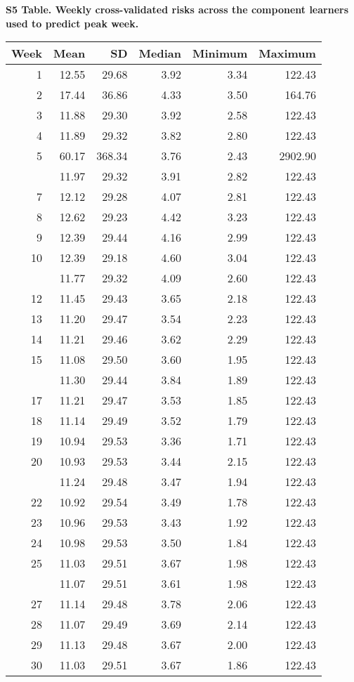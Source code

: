\documentclass[10pt,letterpaper]{article}
\begin{document}
\newpage

\noindent \textbf{S5 Table. Weekly cross-validated risks across the
component learners used to predict peak week.}

\begin{tabular}{rrrrrr}
\toprule
Week & Mean & SD & Median & Minimum & Maximum\\
\midrule
1 & 12.55 & 29.68 & 3.92 & 3.34 & 122.43\\
2 & 17.44 & 36.86 & 4.33 & 3.50 & 164.76\\
3 & 11.88 & 29.30 & 3.92 & 2.58 & 122.43\\
4 & 11.89 & 29.32 & 3.82 & 2.80 & 122.43\\
5 & 60.17 & 368.34 & 3.76 & 2.43 & 2902.90\\
\addlinespace
6 & 11.97 & 29.32 & 3.91 & 2.82 & 122.43\\
7 & 12.12 & 29.28 & 4.07 & 2.81 & 122.43\\
8 & 12.62 & 29.23 & 4.42 & 3.23 & 122.43\\
9 & 12.39 & 29.44 & 4.16 & 2.99 & 122.43\\
10 & 12.39 & 29.18 & 4.60 & 3.04 & 122.43\\
\addlinespace
11 & 11.77 & 29.32 & 4.09 & 2.60 & 122.43\\
12 & 11.45 & 29.43 & 3.65 & 2.18 & 122.43\\
13 & 11.20 & 29.47 & 3.54 & 2.23 & 122.43\\
14 & 11.21 & 29.46 & 3.62 & 2.29 & 122.43\\
15 & 11.08 & 29.50 & 3.60 & 1.95 & 122.43\\
\addlinespace
16 & 11.30 & 29.44 & 3.84 & 1.89 & 122.43\\
17 & 11.21 & 29.47 & 3.53 & 1.85 & 122.43\\
18 & 11.14 & 29.49 & 3.52 & 1.79 & 122.43\\
19 & 10.94 & 29.53 & 3.36 & 1.71 & 122.43\\
20 & 10.93 & 29.53 & 3.44 & 2.15 & 122.43\\
\addlinespace
21 & 11.24 & 29.48 & 3.47 & 1.94 & 122.43\\
22 & 10.92 & 29.54 & 3.49 & 1.78 & 122.43\\
23 & 10.96 & 29.53 & 3.43 & 1.92 & 122.43\\
24 & 10.98 & 29.53 & 3.50 & 1.84 & 122.43\\
25 & 11.03 & 29.51 & 3.67 & 1.98 & 122.43\\
\addlinespace
26 & 11.07 & 29.51 & 3.61 & 1.98 & 122.43\\
27 & 11.14 & 29.48 & 3.78 & 2.06 & 122.43\\
28 & 11.07 & 29.49 & 3.69 & 2.14 & 122.43\\
29 & 11.13 & 29.48 & 3.67 & 2.00 & 122.43\\
30 & 11.03 & 29.51 & 3.67 & 1.86 & 122.43\\
\bottomrule
\end{tabular}
\end{document}
